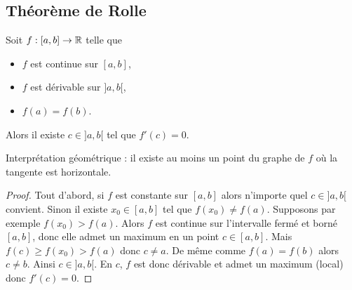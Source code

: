 \documentclass[class=report,crop=false]{standalone}
\begin{document}
\subsection{Théorème de Rolle}

\begin{theoreme}
\label{th:rolle}
Soit $f:[a,b] \to \mathbb{R}$ telle que
\begin{itemize}
  \item $f$ est continue sur $[a,b]$,
  \item $f$ est dérivable sur $]a,b[$,
  \item $f(a)=f(b)$.
\end{itemize}
Alors il existe $c \in ]a,b[$  tel que $f'(c)=0$.
\end{theoreme}


Interprétation géométrique : il existe au moins un point du graphe de $f$ où la tangente est horizontale.

\begin{proof}
Tout d'abord, si $f$ est constante sur $[a,b]$ alors n'importe quel $c\in]a,b[$ convient.
Sinon il existe $x_0 \in [a,b]$ tel que $f(x_0) \neq f(a)$.
Supposons par exemple $f(x_0) > f(a)$. Alors $f$ est continue sur l'intervalle fermé et borné
$[a,b]$, donc elle admet un maximum en un point $c\in[a,b]$.
Mais $f(c) \ge f(x_0) > f(a)$ donc $c \neq a$. De même comme $f(a)=f(b)$ alors  $c\neq b$.
Ainsi $c\in ]a,b[$.
En $c$, $f$ est donc dérivable et admet un maximum (local) donc $f'(c)=0$.
\end{proof}
\end{document}
